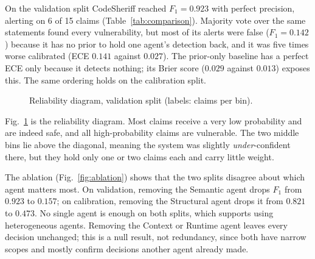 \documentclass[conference]{IEEEtran}
\begin{document}
On the validation split CodeSheriff reached $F_1=0.923$ with perfect
precision, alerting on 6 of 15 claims (Table~\ref{tab:comparison}).
Majority vote over the same statements found every vulnerability, but most
of its alerts were false ($F_1=0.142$) because it has no prior to hold one
agent's detection back, and it was five times worse calibrated (ECE $0.141$
against $0.027$). The prior-only baseline has a perfect ECE only because it
detects nothing; its Brier score ($0.029$ against $0.013$) exposes this.
The same ordering holds on the calibration split.

\begin{figure}[t]
\centering
{}
\caption{Reliability diagram, validation split (labels: claims per bin).}
\label{fig:reliability}
\end{figure}

Fig.~\ref{fig:reliability} is the reliability diagram. Most claims receive
a very low probability and are indeed safe, and all high-probability claims
are vulnerable. The two middle bins lie above the diagonal, meaning the
system was slightly \emph{under}-confident there, but they hold only one or
two claims each and carry little weight.

The ablation (Fig.~\ref{fig:ablation}) shows that the two splits disagree
about which agent matters most. On validation, removing the Semantic agent
drops $F_1$ from $0.923$ to $0.157$; on calibration, removing the
Structural agent drops it from $0.821$ to $0.473$. No single agent is
enough on both splits, which supports using heterogeneous agents. Removing
the Context or Runtime agent leaves every decision unchanged; this is a
null result, not redundancy, since both have narrow scopes and mostly
confirm decisions another agent already made.
\end{document}
